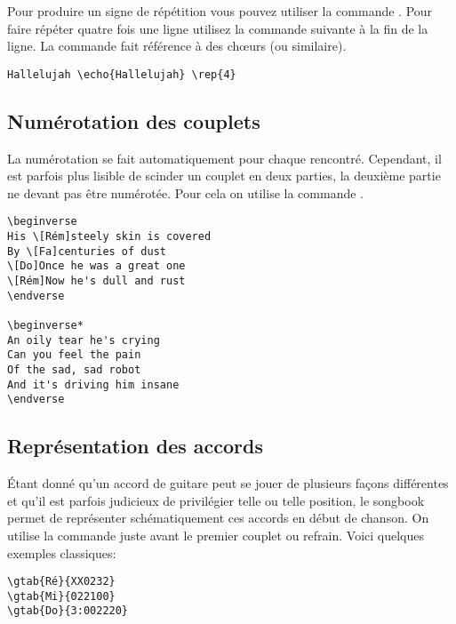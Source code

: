 \documentclass[versionenligne]{framabook}
\begin{document}
Pour produire un signe de répétition vous pouvez utiliser la commande
. Pour faire répéter quatre fois une ligne utilisez la
commande suivante à la fin de la ligne. La commande 
fait référence à des chœurs (ou similaire).

\begin{verbatim}
Hallelujah \echo{Hallelujah} \rep{4}
\end{verbatim}

\subsection{Numérotation des couplets}

La numérotation se fait automatiquement pour chaque 
rencontré. Cependant, il est parfois plus lisible de scinder un
couplet en deux parties, la deuxième partie ne devant pas être
numérotée. Pour cela on utilise la commande .

\begin{verbatim}
\beginverse
His \[Rém]steely skin is covered
By \[Fa]centuries of dust
\[Do]Once he was a great one
\[Rém]Now he's dull and rust
\endverse

\beginverse*
An oily tear he's crying
Can you feel the pain
Of the sad, sad robot
And it's driving him insane
\endverse
\end{verbatim}

\subsection{Représentation des accords}

Étant donné qu'un accord de guitare peut se jouer de plusieurs façons
différentes et qu'il est parfois judicieux de privilégier telle ou
telle position, le songbook permet de représenter schématiquement ces
accords en début de chanson. On utilise la commande  juste
avant le premier couplet ou refrain. Voici quelques exemples classiques:

\begin{verbatim}
\gtab{Ré}{XX0232}
\gtab{Mi}{022100}
\gtab{Do}{3:002220}
\end{verbatim}
\end{document}
